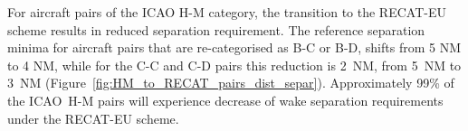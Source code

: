 For aircraft pairs of the ICAO H-M category, the transition to the RECAT-EU scheme results in reduced separation requirement. The reference separation minima for aircraft pairs that are re-categorised as B-C or B-D, shifts from 5 NM to 4 NM, while for the C-C and C-D pairs this reduction is 2~NM, from 5~NM to 3~NM (Figure~\ref{fig:HM_to_RECAT_pairs_dist_separ}). Approximately 99\% of the ICAO~H-M pairs will experience decrease of wake separation requirements under the RECAT-EU scheme.

\begin{figure}[h]
    \centering
    
    
    

\end{figure}
